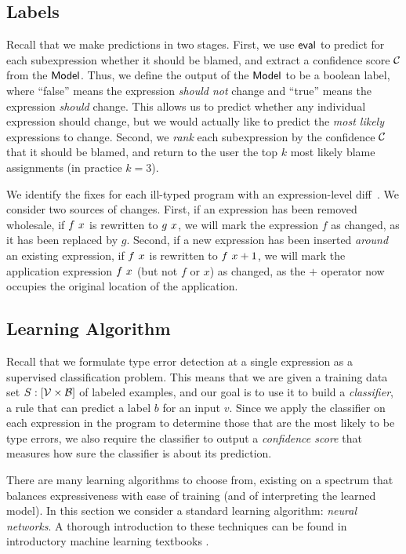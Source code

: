 \subsection{Labels}
\label{sec:labels}
Recall that we make predictions in two stages.
%
First, we use $\mathsf{eval}$ to predict for each subexpression whether it should be blamed, and extract a confidence score
$\mathcal{C}$ from the $\mathsf{Model}$.
%
Thus, we define the output of the $\mathsf{Model}$ to be a boolean label, where ``false'' means the expression \emph{should not}
change and ``true'' means the expression \emph{should} change.
%
This allows us to predict whether any individual expression should change, but we would actually like to predict the
\emph{most likely} expressions to change.
%
Second, we \emph{rank} each subexpression by the confidence $\mathcal{C}$ that it should be blamed, and return to the user
the top $k$ most likely blame assignments (in practice $k=3$).


We identify the fixes for each ill-typed program with an expression-level diff~\citep{Lempsink2009-xf}.
%
We consider two sources of changes.
%
First, if an expression has been removed wholesale, \eg if $f\ x$ is rewritten to $g\ x$, we will mark the
expression $f$ as changed, as it has been replaced by $g$.
%
Second, if a new expression has been inserted \emph{around} an existing expression, \eg if $f\ x$ is rewritten to
$f\ x + 1$, we will mark the application expression $f\ x$ (but not $f$ or $x$) as changed, as the
$+$ operator now occupies the original location of the application.


\subsection{Learning Algorithm}
\label{sec:models}
\lstDeleteShortInline{|} %

Recall that we formulate type error detection at a single expression as a supervised classification problem.
%
This means that we are given a training data set
$S : [\mathcal{V} \times \mathcal{B}]$ of labeled examples, and our goal is to use it to build a \emph{classifier}, \ie a rule that
can predict a label $b$ for an input $v$.
%
Since we apply the classifier on each expression in the program to determine those that are the most likely to be type
errors, we also require the classifier to output a \emph{confidence score} that measures how sure the classifier is
about its prediction.


There are many learning algorithms to choose from, existing on a spectrum that balances expressiveness with ease of
training (and of interpreting the learned model).
%
In this section we consider a standard learning algorithm: \emph{neural networks}.
%
A thorough introduction to these techniques can be found in introductory machine learning textbooks
\citep[\eg][]{Hastie2009-bn}.
%


